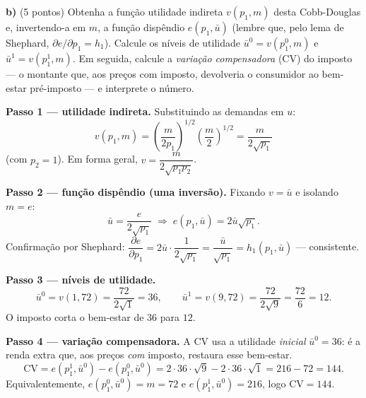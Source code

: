\textbf{b)} (5 pontos) Obtenha a função utilidade indireta $v(p_1,m)$ desta Cobb-Douglas e, invertendo-a em $m$, a função dispêndio $e(p_1,\bar u)$ (lembre que, pelo lema de Shephard, $\partial e/\partial p_1=h_1$). Calcule os níveis de utilidade $\bar u^{0}=v(p_1^{0},m)$ e $\bar u^{1}=v(p_1^{1},m)$. Em seguida, calcule a \emph{variação compensadora} (CV) do imposto --- o montante que, aos preços com imposto, devolveria o consumidor ao bem-estar pré-imposto --- e interprete o número.
\resolucaobox{7.2cm}
\begin{solucao}
\textbf{Passo 1 --- utilidade indireta.} Substituindo as demandas em $u$:
\[
v(p_1,m)=\left(\dfrac{m}{2p_1}\right)^{1/2}\left(\dfrac{m}{2}\right)^{1/2}=\dfrac{m}{2\sqrt{p_1}}
\] (com $p_2=1$). Em forma geral, $v=\dfrac{m}{2\sqrt{p_1p_2}}$.

\textbf{Passo 2 --- função dispêndio (uma inversão).} Fixando $v=\bar u$ e isolando $m=e$:
\[
\bar u=\frac{e}{2\sqrt{p_1}}\;\Rightarrow\; e(p_1,\bar u)=2\bar u\sqrt{p_1}.
\]
Confirmação por Shephard: $\dfrac{\partial e}{\partial p_1}=2\bar u\cdot\dfrac{1}{2\sqrt{p_1}}=\dfrac{\bar u}{\sqrt{p_1}}=h_1(p_1,\bar u)$ --- consistente.

\textbf{Passo 3 --- níveis de utilidade.}
\[
\bar u^{0}=v(1,72)=\frac{72}{2\sqrt{1}}=36,\qquad \bar u^{1}=v(9,72)=\frac{72}{2\sqrt{9}}=\frac{72}{6}=12.
\]
O imposto corta o bem-estar de $36$ para $12$.

\textbf{Passo 4 --- variação compensadora.} A CV usa a utilidade \emph{inicial} $\bar u^{0}=36$: é a renda extra que, aos preços \emph{com} imposto, restaura esse bem-estar.
\[
\mathrm{CV}=e(p_1^{1},\bar u^{0})-e(p_1^{0},\bar u^{0})=2\cdot 36\cdot\sqrt{9}-2\cdot 36\cdot\sqrt{1}=216-72=144.
\]
Equivalentemente, $e(p_1^{0},\bar u^{0})=m=72$ e $e(p_1^{1},\bar u^{0})=216$, logo $\mathrm{CV}=144$.


\end{solucao}
